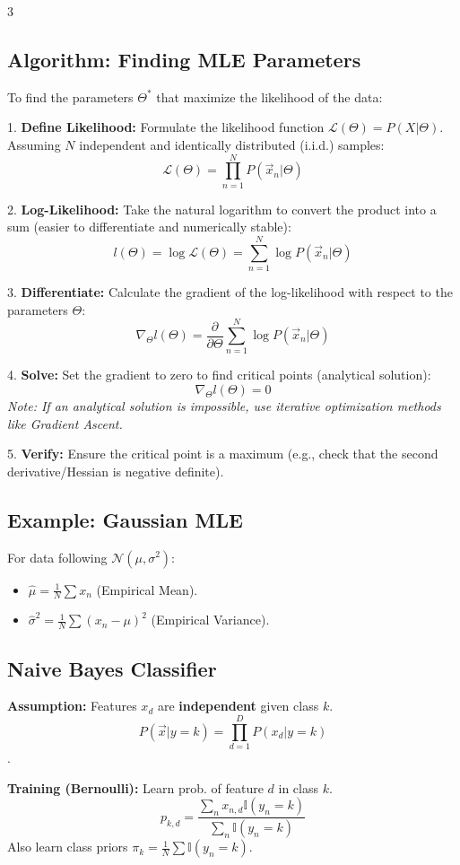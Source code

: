 \documentclass[10pt, a4paper, landscape]{article}
\begin{document}
\begin{multicols*}{3}
\subsection{Algorithm: Finding MLE Parameters}
To find the parameters $\Theta^*$ that maximize the likelihood of the data:

1. \textbf{Define Likelihood:} Formulate the likelihood function $\mathcal{L}(\Theta) = P(X | \Theta)$. Assuming $N$ independent and identically distributed (i.i.d.) samples:
   $$ \mathcal{L}(\Theta) = \prod_{n=1}^{N} P(\vec{x}_n | \Theta) $$

2. \textbf{Log-Likelihood:} Take the natural logarithm to convert the product into a sum (easier to differentiate and numerically stable):
   $$ l(\Theta) = \log \mathcal{L}(\Theta) = \sum_{n=1}^{N} \log P(\vec{x}_n | \Theta) $$

3. \textbf{Differentiate:} Calculate the gradient of the log-likelihood with respect to the parameters $\Theta$:
   $$ \nabla_{\Theta} l(\Theta) = \frac{\partial}{\partial \Theta} \sum_{n=1}^{N} \log P(\vec{x}_n | \Theta) $$

4. \textbf{Solve:} Set the gradient to zero to find critical points (analytical solution):
   $$ \nabla_{\Theta} l(\Theta) = 0 $$
   \textit{Note: If an analytical solution is impossible, use iterative optimization methods like Gradient Ascent.}

5. \textbf{Verify:} Ensure the critical point is a maximum (e.g., check that the second derivative/Hessian is negative definite).

\subsection{Example: Gaussian MLE}
For data following $\mathcal{N}(\mu, \sigma^2)$:
\begin{itemize}
    \item $\hat{\mu} = \frac{1}{N} \sum x_n$ (Empirical Mean).
    \item $\hat{\sigma}^2 = \frac{1}{N} \sum (x_n - \mu)^2$ (Empirical Variance).
\end{itemize}

\subsection{Naive Bayes Classifier}
\textbf{Assumption:} Features $x_d$ are \textbf{independent} given class $k$.
$$ P(\vec{x}|y=k) = \prod_{d=1}^D P(x_d | y=k) $$
.

\textbf{Training (Bernoulli):} Learn prob. of feature $d$ in class $k$.
$$ p_{k,d} = \frac{\sum_{n} x_{n,d} \mathbb{I}(y_n=k)}{\sum_{n} \mathbb{I}(y_n=k)} $$
Also learn class priors $\pi_k = \frac{1}{N} \sum \mathbb{I}(y_n=k)$.


\end{multicols*}
\end{document}
